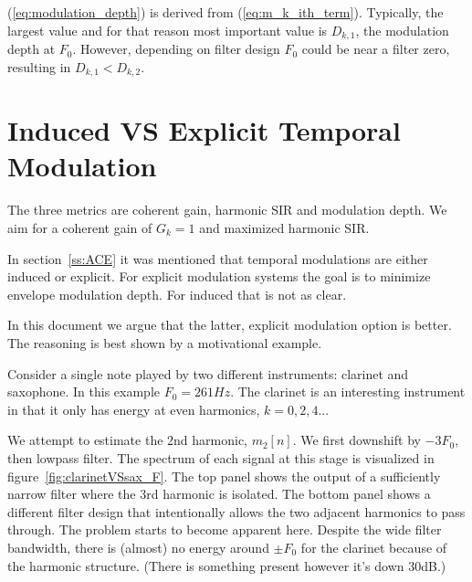 \documentclass [11pt, proquest,oneside] {ganter_thesis}[2015/03/03]
\begin{document}
(\ref{eq:modulation_depth}) is derived from (\ref{eq:m_k_ith_term}).  Typically, the largest value and for that reason most important value is $D_{k,1}$, the modulation depth at $F_0$.  However, depending on filter design $F_0$ could be near a filter zero, resulting in $D_{k,1} < D_{k,2}$.

\section{Induced VS Explicit Temporal Modulation}\label{section:inducedVexplicit}

The three metrics are coherent gain, harmonic SIR and modulation depth.  We aim for a coherent gain of $G_k = 1$ and maximized harmonic SIR.

In section~\ref{ss:ACE} it was mentioned that temporal modulations are either induced or explicit.  For explicit modulation systems the goal is to minimize envelope modulation depth.  For induced that is not as clear.

In this document we argue that the latter, explicit modulation option is better.  The reasoning is best shown by a motivational example.

Consider a single note played by two different instruments: clarinet and saxophone.  In this example $F_0 = 261Hz$.  The clarinet is an interesting instrument in that it only has energy at even harmonics, $k = 0, 2, 4...$

We attempt to estimate the 2nd harmonic, $m_2[n]$.  We first downshift by $-3F_0$, then lowpass filter.  The spectrum of each signal at this stage is visualized in figure~\ref{fig:clarinetVSsax_F}.  The top panel shows the output of a sufficiently narrow filter where the 3rd harmonic is isolated.  The bottom panel shows a different filter design that intentionally allows the two adjacent harmonics to pass through.  The problem starts to become apparent here.  Despite the wide filter bandwidth, there is (almost) no energy around $\pm F_0$ for the clarinet because of the harmonic structure.  (There is something present however it's down 30dB.)
\end{document}
